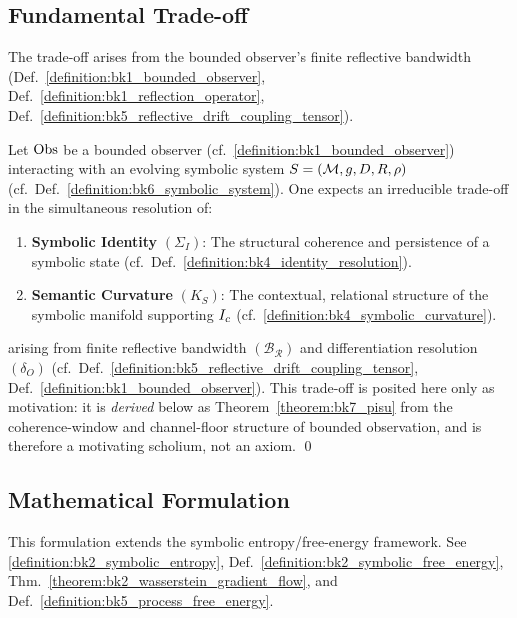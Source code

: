 \subsection{Fundamental Trade-off}
\label{subsec:bk7_pisu_axiom_statement}
The trade-off arises from the bounded observer's finite reflective bandwidth
(Def.~\ref{definition:bk1_bounded_observer},
Def.~\ref{definition:bk1_reflection_operator},
Def.~\ref{definition:bk5_reflective_drift_coupling_tensor}).
\begin{scholium}
\label{scholium:bk7_constrained_uncertainty_motivation}
Let $\mathrm{Obs}$ be a bounded observer (cf.~\ref{definition:bk1_bounded_observer}) interacting with an evolving symbolic system $S = (\mathcal{M}, g, D, R, \rho)$ (cf.~Def.~\ref{definition:bk6_symbolic_system}). One expects an irreducible trade-off in the simultaneous resolution of:
\begin{enumerate}
    \item \textbf{Symbolic Identity} $(\Sigma_I)$: The structural coherence and persistence of a symbolic state (cf.~Def.~\ref{definition:bk4_identity_resolution}).
    \item \textbf{Semantic Curvature} $(K_S)$: The contextual, relational structure of the symbolic manifold supporting $I_c$ (cf.~\ref{definition:bk4_symbolic_curvature}).
\end{enumerate}
arising from finite reflective bandwidth $(\mathcal{B_R})$ and differentiation resolution $(\delta_O)$ (cf.~Def.~\ref{definition:bk5_reflective_drift_coupling_tensor}, Def.~\ref{definition:bk1_bounded_observer}). This trade-off is posited here only as motivation: it is \emph{derived} below as Theorem~\ref{theorem:bk7_pisu} from the coherence-window and channel-floor structure of bounded observation, and is therefore a motivating scholium, not an axiom. \qed
\end{scholium}

\subsection{Mathematical Formulation}
\label{subsec:bk7_pisu_formula}
This formulation extends the symbolic entropy/free-energy framework.
See \ref{definition:bk2_symbolic_entropy}, Def.~\ref{definition:bk2_symbolic_free_energy}, Thm.~\ref{theorem:bk2_wasserstein_gradient_flow}, and Def.~\ref{definition:bk5_process_free_energy}.

